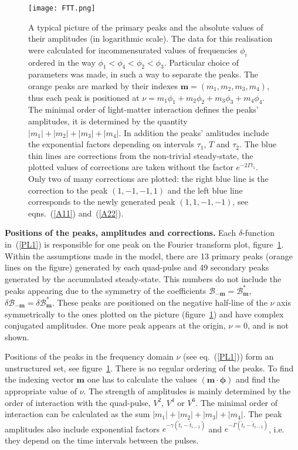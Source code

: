 \documentclass[prb,twocolumn,showpacs,epsfig,epsf]{revtex4}
\newcommand{\abs}[1]{\left\vert#1\right\vert}
\newcommand{\1}{\mathds{1}}
\begin{document}
\begin{figure}[t]
\texttt{[image: FTT.png]}\\
\caption{\small A typical picture of the primary peaks and the absolute values of their amplitudes (in logarithmic scale). The data for this realisation were calculated for incommensurated values of frequencies $\phi_i$ ordered in the way $\phi_1<\phi_4<\phi_2<\phi_3$. Particular choice of parameters was made, in such a way to separate the peaks. The orange peaks are marked by their indexes $\boldsymbol m=(m_1,m_2,m_3,m_4)$, thus each peak is positioned at $\nu=m_1\phi_1+m_2 \phi_2+m_3\phi_3+m_4\phi_4$. The minimal order of light-matter interaction defines the peaks' amplitudes, it is determined by the quantity $\abs{m_1}+\abs{m_2}+\abs{m_3}+\abs{m_4}$. In addition the peaks' amlitudes include the exponential factors depending on intervals $\tau_1$, $T$ and $\tau_2$. The blue thin lines are corrections from the non-trivial steady-state, the plotted values of corrections are taken without the factor $e^{-2\Gamma t_1}$. Only two of many corrections are plotted: the right blue line is the correction to the peak $(1,-1,-1,1)$ and the left blue line corresponds to the newly generated peak $(1,1,-1,-1)$, see eqns.~(\ref{A11}) and~(\ref{A22}). \label{Fig2}}
\end{figure}

{\bf Positions of the peaks, amplitudes and corrections.} Each $\delta$-function in~(\ref{PL1}) is responsible for one peak on the Fourier transform plot, figure~\ref{Fig2}. Within the assumptions made in the model, there are 13 primary peaks (orange lines on the figure) generated by each quad-pulse and 49 secondary peaks generated by the accumulated steady-state. This numbers do not include the peaks appearing due to the symmetry of the coefficients $\mathcal{B}_{-\boldsymbol m}=\mathcal{B}^*_{\boldsymbol m}$, $\delta\mathcal{B}_{-\boldsymbol m}=\delta\mathcal{B}^*_{\boldsymbol m}$. These peaks are positioned on the negative half-line of the $\nu$ axis symmetrically to the ones plotted on the picture (figure~\ref{Fig2}) and have complex conjugated amplitudes. One more peak appears at the origin, $\nu=0$, and is not shown.
 
Positions of the peaks in the frequency domain $\nu$ (see eq.~(\ref{PL1})) form an unstructured set, see figure~\ref{Fig2}. There is no regular ordering of the peaks. To find the indexing vector $\bm m$ one has to calculate the values $(\boldsymbol m\cdot\boldsymbol\phi)$ and find the appropriate value of $\nu$. The strength of amplitudes is mainly determined by the order of interaction with the quad-pulse, $V^2$, $V^4$ or $V^6$. The minimal order of interaction can be calculated as the sum $\abs{m_1}+\abs{m_2}+\abs{m_3}+\abs{m_4}$. The peak amplitudes also include exponential factors $e^{-\gamma(\tilde t_i-\tilde t_{i-1})}$ and $e^{-\Gamma(\tilde t_i-\tilde t_{i-1})}$, i.e. they depend on the time intervals between the pulses. 
\end{document}
